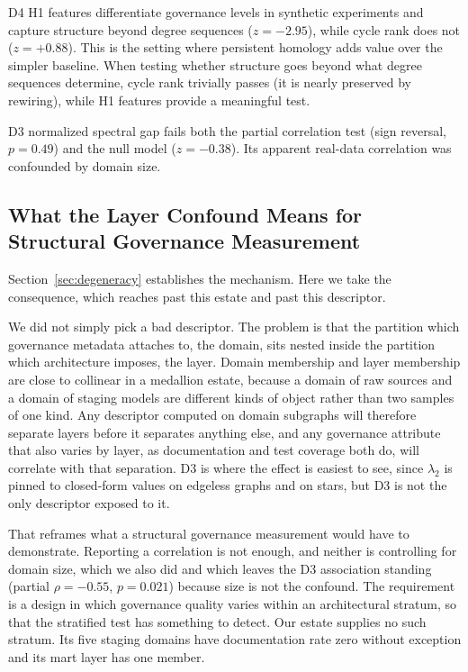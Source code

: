 \documentclass[11pt,a4paper]{article}
\begin{document}
D4 H1 features differentiate governance levels in synthetic experiments
and capture structure beyond degree sequences ($z = -2.95$), while
cycle rank does not ($z = +0.88$). This is the setting where persistent
homology adds value over the simpler baseline. When testing whether
structure goes beyond what degree sequences determine, cycle rank
trivially passes (it is nearly preserved by rewiring), while H1
features provide a meaningful test.

D3 normalized spectral gap fails both the partial correlation test (sign
reversal, $p = 0.49$) and the null model ($z = -0.38$). Its apparent
real-data correlation was confounded by domain size.

\subsection{What the Layer Confound Means for Structural Governance
Measurement}

Section~\ref{sec:degeneracy} establishes the mechanism. Here we take the
consequence, which reaches past this estate and past this descriptor.

We did not simply pick a bad descriptor. The problem is that the
partition which governance metadata attaches to, the domain, sits nested
inside the partition which architecture imposes, the layer. Domain
membership and layer membership are close to collinear in a medallion
estate, because a domain of raw sources and a domain of staging models
are different kinds of object rather than two samples of one kind. Any
descriptor computed on domain subgraphs will therefore separate layers
before it separates anything else, and any governance attribute that
also varies by layer, as documentation and test coverage both do, will
correlate with that separation. D3 is where the effect is easiest to
see, since $\lambda_2$ is pinned to closed-form values on edgeless
graphs and on stars, but D3 is not the only descriptor exposed to it.

That reframes what a structural governance measurement would have to
demonstrate. Reporting a correlation is not enough, and neither is
controlling for domain size, which we also did and which leaves the D3
association standing (partial $\rho = -0.55$, $p = 0.021$) because size
is not the confound. The requirement is a design in which governance
quality varies within an architectural stratum, so that the stratified
test has something to detect. Our estate supplies no such stratum. Its
five staging domains have documentation rate zero without exception and
its mart layer has one member.
\end{document}
